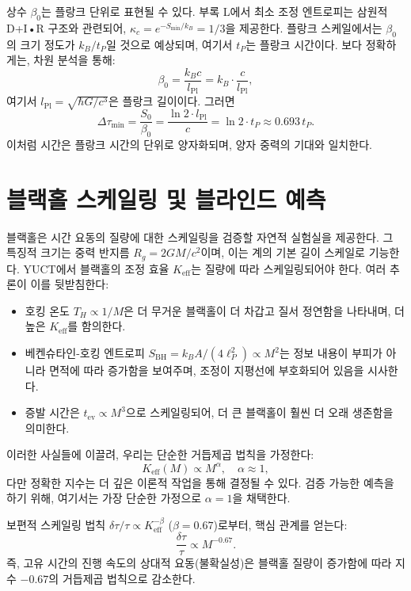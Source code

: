 \documentclass[12pt,a4paper]{article}
\newcommand{\Keff}{K_{\mathrm{eff}}}
\newcommand{\kappac}{\kappa_c}
\newcommand{\Lpl}{l_{\mathrm{Pl}}}
\begin{document}
	상수 \(\beta_0\)는 플랑크 단위로 표현될 수 있다. 부록 L에서 최소 조정 엔트로피는 삼원적 D+I•R 구조와 관련되어, \(\kappac = e^{-S_{\min}/k_B} = 1/3\)을 제공한다. 플랑크 스케일에서는 \(\beta_0\)의 크기 정도가 \(k_B / t_P\)일 것으로 예상되며, 여기서 \(t_P\)는 플랑크 시간이다. 보다 정확하게는, 차원 분석을 통해:
	\begin{equation}
		\beta_0 = \frac{k_B c}{\Lpl} = k_B \cdot \frac{c}{\Lpl},
	\end{equation}
	여기서 \(\Lpl = \sqrt{\hbar G/c^3}\)은 플랑크 길이이다. 그러면
	\begin{equation}
		\Delta \tau_{\min} = \frac{S_0}{\beta_0} = \frac{\ln 2 \cdot \Lpl}{c} = \ln 2 \cdot t_P \approx 0.693 \, t_P.
	\end{equation}
	이처럼 시간은 플랑크 시간의 단위로 양자화되며, 양자 중력의 기대와 일치한다.
	
	\section{블랙홀 스케일링 및 블라인드 예측}
	\label{sec:blackhole}
	
	블랙홀은 시간 요동의 질량에 대한 스케일링을 검증할 자연적 실험실을 제공한다. 그 특징적 크기는 중력 반지름 \(R_g = 2GM/c^2\)이며, 이는 계의 기본 길이 스케일로 기능한다. YUCT에서 블랙홀의 조정 효율 \(\Keff\)는 질량에 따라 스케일링되어야 한다. 여러 추론이 이를 뒷받침한다:
	\begin{itemize}
		\item 호킹 온도 \(T_H \propto 1/M\)은 더 무거운 블랙홀이 더 차갑고 질서 정연함을 나타내며, 더 높은 \(\Keff\)를 함의한다.
		\item 베켄슈타인-호킹 엔트로피 \(S_{\text{BH}} = k_B A/(4\ell_P^2) \propto M^2\)는 정보 내용이 부피가 아니라 면적에 따라 증가함을 보여주며, 조정이 지평선에 부호화되어 있음을 시사한다.
		\item 증발 시간은 \(t_{\text{ev}} \propto M^3\)으로 스케일링되어, 더 큰 블랙홀이 훨씬 더 오래 생존함을 의미한다.
	\end{itemize}
	이러한 사실들에 이끌려, 우리는 단순한 거듭제곱 법칙을 가정한다:
	\begin{equation}
		\Keff(M) \propto M^{\alpha}, \quad \alpha \approx 1,
	\end{equation}
	다만 정확한 지수는 더 깊은 이론적 작업을 통해 결정될 수 있다. 검증 가능한 예측을 하기 위해, 여기서는 가장 단순한 가정으로 \(\alpha = 1\)을 채택한다.
	
	보편적 스케일링 법칙 \(\delta \tau / \tau \propto \Keff^{-\beta}\) (\(\beta = 0.67\))로부터, 핵심 관계를 얻는다:
	\begin{equation}
		\boxed{\frac{\delta \tau}{\tau} \propto M^{-0.67}}.
	\end{equation}
	즉, 고유 시간의 진행 속도의 상대적 요동(불확실성)은 블랙홀 질량이 증가함에 따라 지수 \(-0.67\)의 거듭제곱 법칙으로 감소한다.
	
\end{document}
